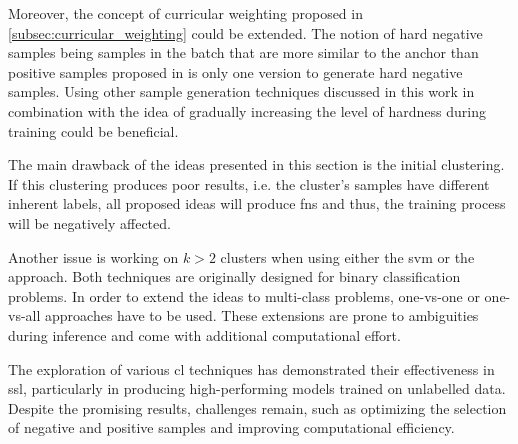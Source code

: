 Moreover, the concept of curricular weighting proposed in \autoref{subsec:curricular_weighting} could be extended.
The notion of hard negative samples being samples in the batch that are more similar to the anchor than positive samples 
proposed in \citet{curricular_weighting_2024} is only one version to generate hard negative samples.
Using other sample generation techniques discussed in this work in combination with 
the idea of gradually increasing the level of hardness during training could be beneficial.

The main drawback of the ideas presented in this section is the initial clustering.
If this clustering produces poor results, i.e. the cluster's samples have different inherent labels, 
all proposed ideas will produce \acp{fn} and thus, the training process will be negatively affected.

Another issue is working on $k>2$ clusters when using either the \ac{svm} or the \fisher{} approach.
Both techniques are originally designed for binary classification problems.
In order to extend the ideas to multi-class problems, one-vs-one or one-vs-all approaches have to be used. 
These extensions are prone to ambiguities during inference and 
come with additional computational effort.

The exploration of various \ac{cl} techniques has demonstrated their effectiveness in \ac{ssl}, 
particularly in producing high-performing models trained on unlabelled data. 
Despite the promising results, challenges remain, such as optimizing the selection of negative and positive samples 
and improving computational efficiency.